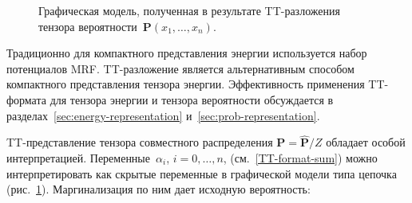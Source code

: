 \begin{figure}
\begin{center}
{}
\caption{Графическая модель, полученная в результате TT\hyp{}разложения тензора вероятности~$\mathbf{P}(x_1, \ldots, x_n)$.}
\label{fig:TT-graphical-model}
\end{center}
\vskip -0.2in
\end{figure}


Традиционно для компактного представления энергии используется набор потенциалов MRF. TT\hyp{}разложение является альтернативным способом компактного представления тензора энергии. Эффективность применения TT\hyp{}формата для тензора энергии и тензора вероятности обсуждается в разделах~\ref{sec:energy-representation} и~\ref{sec:prob-representation}.


TT\hyp{}представление тензора совместного распределения $\mathbf{P} = \mathbf{\widehat{P}} / Z$ обладает особой интерпретацией. Переменные~$\alpha_i$, $i=0,\ldots,n$, (см.~\eqref{TT-format-sum}) можно интерпретировать как скрытые переменные в графической модели типа цепочка (рис.~\ref{fig:TT-graphical-model}). Маргинализация по ним дает исходную вероятность:

